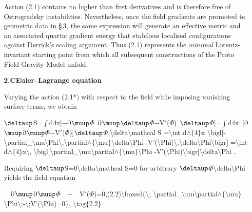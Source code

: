\documentclass{iopjournal}
\begin{document}
Action (2.1) contains no higher than first derivatives and is therefore free of Ostrogradsky instabilities. Nevertheless, once the field gradients are promoted to geometric data in {\S} 3, the same expression will generate an effective metric and an associated quartic gradient energy that stabilises localised configurations against Derrick's scaling argument. Thus (2.1) represents the \textit{minimal} Lorentz-invariant starting point from which all subsequent constructions of the Proto Field Gravity Model unfold.


\textbf{2.C{\qquad}Euler--Lagrange equation}

Varying the action (2.1*) with respect to the field while imposing vanishing surface terms, we obtain

 $\deltaup$S=$\mathrm{\int}$d4x[$\mathrm{-}$$\mathrm{\partial}$$\muup$$\Phi$\ $\mathrm{\partial}$$\muup$$\deltaup$$\Phi$$\mathrm{-}$V$\mathrm{\prime}$($\Phi$)\ $\deltaup$$\Phi$]=$\mathrm{\int}$d4x\ [$\mathrm{\partial}$$\muup$$\mathrm{\partial}$$\muup$$\Phi$$\mathrm{-}$V$\mathrm{\prime}$($\Phi$)]$\deltaup$$\Phi$.{\textbackslash}delta{\textbackslash}mathcal S ={\textbackslash}int d$\mathrm{\wedge}$$\mathrm{\{}$4$\mathrm{\}}$x {\textbackslash}bigl[-{\textbackslash}partial\_{\textbackslash}mu{\textbackslash}Phi{\textbackslash},{\textbackslash}partial$\mathrm{\wedge}$$\mathrm{\{}${\textbackslash}mu$\mathrm{\}}${\textbackslash}delta{\textbackslash}Phi -V'({\textbackslash}Phi){\textbackslash},{\textbackslash}delta{\textbackslash}Phi{\textbackslash}bigr] ={\textbackslash}int d$\mathrm{\wedge}$$\mathrm{\{}$4$\mathrm{\}}$x{\textbackslash}, {\textbackslash}bigl[{\textbackslash}partial\_{\textbackslash}mu{\textbackslash}partial$\mathrm{\wedge}$$\mathrm{\{}${\textbackslash}mu$\mathrm{\}}${\textbackslash}Phi -V'({\textbackslash}Phi){\textbackslash}bigr]{\textbackslash}delta{\textbackslash}Phi .

Requiring $\deltaup$S=0{\textbackslash}delta{\textbackslash}mathcal S=0 for arbitrary $\deltaup$$\Phi${\textbackslash}delta{\textbackslash}Phi yields the field equation

\ \ $\mathrm{\partial}$$\muup$$\mathrm{\partial}$$\muup$$\Phi$\ \ $\mathrm{-}$\ \ V$\mathrm{\prime}$($\Phi$)=0,(2.2){\textbackslash}boxed$\mathrm{\{}${\textbackslash}; {\textbackslash}partial\_{\textbackslash}mu{\textbackslash}partial$\mathrm{\wedge}$$\mathrm{\{}${\textbackslash}mu$\mathrm{\}}${\textbackslash}Phi{\textbackslash};-{\textbackslash};V'({\textbackslash}Phi)=0$\mathrm{\}}$, {\textbackslash}tag$\mathrm{\{}$2.2$\mathrm{\}}$
\end{document}
